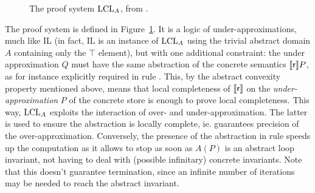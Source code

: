 \begin{figure}[t]
	\centering
	\begin{framed}
	\end{framed}
	\vspace{-1ex}
	\caption{The proof system $\text{LCL}_A$, from \cite{BGGR21}.}\label{fig:sota:lcla-rules}
\end{figure}
The proof system is defined in Figure~\ref{fig:sota:lcla-rules}. It is a logic of under-approximations, much like IL (in fact, IL is an instance of $\text{LCL}_A$ using the trivial abstract domain $A$ containing only the $\top$ element), but with one additional constraint: the under approximation $Q$ must have the same abstraction of the concrete semantics $\llbracket\mathsf{r}\rrbracket P$, as for instance explicitly required in rule . This, by the abstract convexity property mentioned above, means that local completeness of $\llbracket\mathsf{r}\rrbracket$ on the \emph{under-approximation} $P$ of the concrete store is enough to prove local completeness.
This way, $\text{LCL}_A$ exploits the interaction of over- and under-approximation. The latter is used to ensure the abstraction is locally complete, ie. guarantees precision of the over-approximation. Conversely, the presence of the abstraction in rule  speeds up the computation as it allows to stop as soon as $A(P)$ is an abstract loop invariant, not having to deal with (possible infinitary) concrete invariants. Note that this doesn't guarantee termination, since an infinite number of iterations may be needed to reach the abstract invariant.

